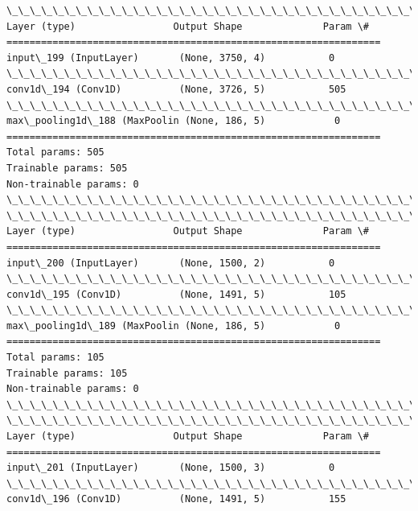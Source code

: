 \documentclass[11pt]{article}
\begin{document}
    \begin{Verbatim}[commandchars=\\\{\}]
\_\_\_\_\_\_\_\_\_\_\_\_\_\_\_\_\_\_\_\_\_\_\_\_\_\_\_\_\_\_\_\_\_\_\_\_\_\_\_\_\_\_\_\_\_\_\_\_\_\_\_\_\_\_\_\_\_\_\_\_\_\_\_\_\_
Layer (type)                 Output Shape              Param \#   
=================================================================
input\_199 (InputLayer)       (None, 3750, 4)           0         
\_\_\_\_\_\_\_\_\_\_\_\_\_\_\_\_\_\_\_\_\_\_\_\_\_\_\_\_\_\_\_\_\_\_\_\_\_\_\_\_\_\_\_\_\_\_\_\_\_\_\_\_\_\_\_\_\_\_\_\_\_\_\_\_\_
conv1d\_194 (Conv1D)          (None, 3726, 5)           505       
\_\_\_\_\_\_\_\_\_\_\_\_\_\_\_\_\_\_\_\_\_\_\_\_\_\_\_\_\_\_\_\_\_\_\_\_\_\_\_\_\_\_\_\_\_\_\_\_\_\_\_\_\_\_\_\_\_\_\_\_\_\_\_\_\_
max\_pooling1d\_188 (MaxPoolin (None, 186, 5)            0         
=================================================================
Total params: 505
Trainable params: 505
Non-trainable params: 0
\_\_\_\_\_\_\_\_\_\_\_\_\_\_\_\_\_\_\_\_\_\_\_\_\_\_\_\_\_\_\_\_\_\_\_\_\_\_\_\_\_\_\_\_\_\_\_\_\_\_\_\_\_\_\_\_\_\_\_\_\_\_\_\_\_
\_\_\_\_\_\_\_\_\_\_\_\_\_\_\_\_\_\_\_\_\_\_\_\_\_\_\_\_\_\_\_\_\_\_\_\_\_\_\_\_\_\_\_\_\_\_\_\_\_\_\_\_\_\_\_\_\_\_\_\_\_\_\_\_\_
Layer (type)                 Output Shape              Param \#   
=================================================================
input\_200 (InputLayer)       (None, 1500, 2)           0         
\_\_\_\_\_\_\_\_\_\_\_\_\_\_\_\_\_\_\_\_\_\_\_\_\_\_\_\_\_\_\_\_\_\_\_\_\_\_\_\_\_\_\_\_\_\_\_\_\_\_\_\_\_\_\_\_\_\_\_\_\_\_\_\_\_
conv1d\_195 (Conv1D)          (None, 1491, 5)           105       
\_\_\_\_\_\_\_\_\_\_\_\_\_\_\_\_\_\_\_\_\_\_\_\_\_\_\_\_\_\_\_\_\_\_\_\_\_\_\_\_\_\_\_\_\_\_\_\_\_\_\_\_\_\_\_\_\_\_\_\_\_\_\_\_\_
max\_pooling1d\_189 (MaxPoolin (None, 186, 5)            0         
=================================================================
Total params: 105
Trainable params: 105
Non-trainable params: 0
\_\_\_\_\_\_\_\_\_\_\_\_\_\_\_\_\_\_\_\_\_\_\_\_\_\_\_\_\_\_\_\_\_\_\_\_\_\_\_\_\_\_\_\_\_\_\_\_\_\_\_\_\_\_\_\_\_\_\_\_\_\_\_\_\_
\_\_\_\_\_\_\_\_\_\_\_\_\_\_\_\_\_\_\_\_\_\_\_\_\_\_\_\_\_\_\_\_\_\_\_\_\_\_\_\_\_\_\_\_\_\_\_\_\_\_\_\_\_\_\_\_\_\_\_\_\_\_\_\_\_
Layer (type)                 Output Shape              Param \#   
=================================================================
input\_201 (InputLayer)       (None, 1500, 3)           0         
\_\_\_\_\_\_\_\_\_\_\_\_\_\_\_\_\_\_\_\_\_\_\_\_\_\_\_\_\_\_\_\_\_\_\_\_\_\_\_\_\_\_\_\_\_\_\_\_\_\_\_\_\_\_\_\_\_\_\_\_\_\_\_\_\_
conv1d\_196 (Conv1D)          (None, 1491, 5)           155       

\end{Verbatim}
\end{document}
